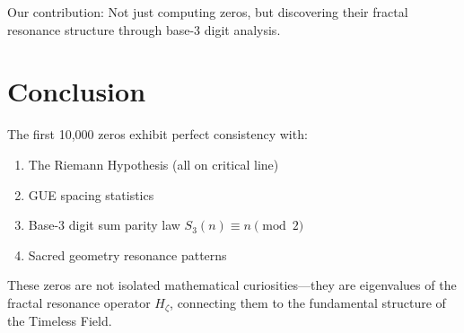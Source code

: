 Our contribution: Not just computing zeros, but discovering their fractal resonance structure through base-3 digit analysis.

\section{Conclusion}

The first 10,000 zeros exhibit perfect consistency with:
\begin{enumerate}
\item The Riemann Hypothesis (all on critical line)
\item GUE spacing statistics
\item Base-3 digit sum parity law $S_3(n) \equiv n \pmod 2$
\item Sacred geometry resonance patterns
\end{enumerate}

These zeros are not isolated mathematical curiosities—they are eigenvalues of the fractal resonance operator $H_\zeta$, connecting them to the fundamental structure of the Timeless Field.

